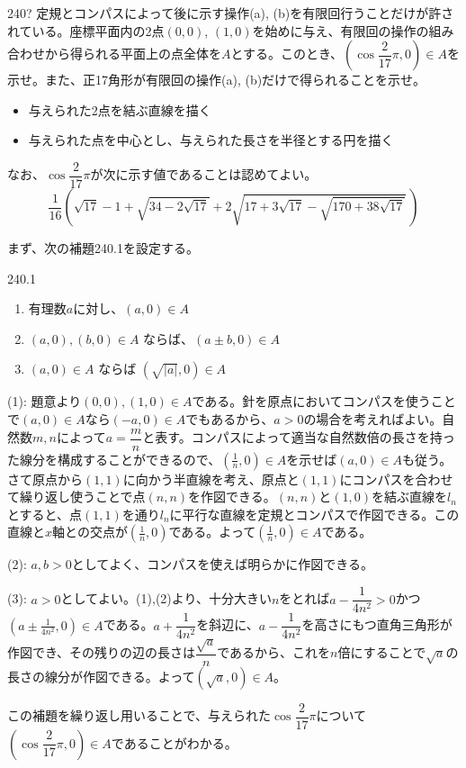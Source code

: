 \begin{prob}{240}{\hosi ?}{}
 定規とコンパスによって後に示す操作(a), (b)を有限回行うことだけが許されている。座標平面内の2点$(0,0)$, $(1,0)$を始めに与え、有限回の操作の組み合わせから得られる平面上の点全体を$A$とする。このとき、$(\cos\dfrac{2}{17}\pi,0)\in A$を示せ。また、正17角形が有限回の操作(a), (b)だけで得られることを示せ。

 \begin{itemize}
  \setlength{\leftskip}{3eM}
  \item[操作(a)] 与えられた2点を結ぶ直線を描く
  \item[操作(b)] 与えられた点を中心とし、与えられた長さを半径とする円を描く
 \end{itemize}

 なお、$\cos\dfrac{2}{17}\pi$が次に示す値であることは認めてよい。
 \[ \!\!\frac{1}{16}\!\!\left(\!\sqrt{17}-1\!+\!\sqrt{34-2\sqrt{17}}+2\sqrt{17\!+\!3\sqrt{17}\!-\!\sqrt{170\!+\!38\sqrt{17}}}\,\right) \]
\end{prob}
まず、次の補題240.1を設定する。
\begin{subthm}{240.1}
 \begin{enumerate}
  \item 有理数$a$に対し、$(a,0)\in A$
  \item $(a,0), (b,0) \in A$ ならば、$(a\pm b, 0) \in A$
  \item $(a,0)\in A$ ならば $(\sqrt{|a|},0) \in A$
 \end{enumerate}
\end{subthm}
(1): 題意より$(0,0), (1,0) \in A$である。針を原点においてコンパスを使うことで$(a,0)\in A$なら$(-a,0) \in A$でもあるから、$a>0$の場合を考えればよい。自然数$m,n$によって$a=\dfrac{m}{n}$と表す。コンパスによって適当な自然数倍の長さを持った線分を構成することができるので、$(\frac{1}{n},0)\in A$を示せば$(a,0)\in A$も従う。さて原点から$(1,1)$に向かう半直線を考え、原点と$(1,1)$にコンパスを合わせて繰り返し使うことで点$(n,n)$を作図できる。$(n,n)$と$(1,0)$を結ぶ直線を$l_n$とすると、点$(1,1)$を通り$l_n$に平行な直線を定規とコンパスで作図できる。この直線と$x$軸との交点が$(\frac{1}{n},0)$である。よって$(\frac{1}{n},0)\in A$である。

(2): $a,b>0$としてよく、コンパスを使えば明らかに作図できる。

(3): $a>0$としてよい。(1),(2)より、十分大きい$n$をとれば$a-\dfrac{1}{4n^2}>0$かつ $(a\pm\frac{1}{4n^2},0) \in A$である。$a+\dfrac{1}{4n^2}$を斜辺に、$a-\dfrac{1}{4n^2}$を高さにもつ直角三角形が作図でき、その残りの辺の長さは$\dfrac{\sqrt{a}}{n}$であるから、これを$n$倍にすることで$\sqrt{a}$の長さの線分が作図できる。よって$(\sqrt{a},0) \in A$。

この補題を繰り返し用いることで、与えられた$\cos\dfrac{2}{17}\pi$について$(\cos\dfrac{2}{17}\pi,0) \in A$であることがわかる。